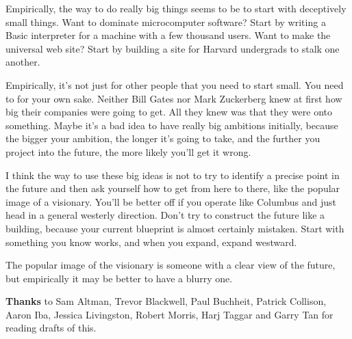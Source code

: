 Empirically, the way to do really big things seems to be to start with
deceptively small things. Want to dominate microcomputer software? Start
by writing a Basic interpreter for a machine with a few thousand users.
Want to make the universal web site? Start by building a site for
Harvard undergrads to stalk one another.

Empirically, it's not just for other people that you need to start
small. You need to for your own sake. Neither Bill Gates nor Mark
Zuckerberg knew at first how big their companies were going to get. All
they knew was that they were onto something. Maybe it's a bad idea to
have really big ambitions initially, because the bigger your ambition,
the longer it's going to take, and the further you project into the
future, the more likely you'll get it wrong.

I think the way to use these big ideas is not to try to identify a
precise point in the future and then ask yourself how to get from here
to there, like the popular image of a visionary. You'll be better off if
you operate like Columbus and just head in a general westerly direction.
Don't try to construct the future like a building, because your current
blueprint is almost certainly mistaken. Start with something you know
works, and when you expand, expand westward.

The popular image of the visionary is someone with a clear view of the
future, but empirically it may be better to have a blurry one.


\textbf{Thanks} to Sam Altman, Trevor Blackwell, Paul Buchheit, Patrick
Collison, Aaron Iba, Jessica Livingston, Robert Morris, Harj Taggar and
Garry Tan for reading drafts of this.